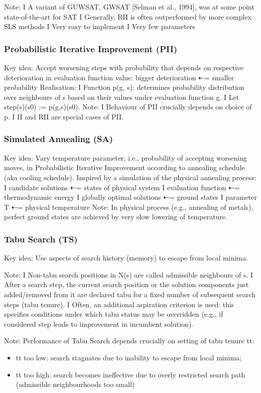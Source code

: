 \documentclass[a4paper,10pt]{article}
\begin{document}
Note:
I A variant of GUWSAT, GWSAT [Selman et al., 1994], was at some point state-of-the-art for SAT
I Generally, RII is often outperformed by more complex SLS methods
I Very easy to implement I Very few parameters

\subsubsection{Probabilistic Iterative Improvement (PII)}
Key idea: Accept worsening steps with probability that depends on respective deterioration in evaluation function value:
bigger deterioration ⇠= smaller probability
Realisation:
I Function p(g, s): determines probability distribution over neighbours of s based on their values under evaluation function g.
I Let step(s)(s0) := p(g,s)(s0). Note:
I Behaviour of PII crucially depends on choice of p. I II and RII are special cases of PII.

\subsubsection{Simulated Annealing (SA)}
Key idea: Vary temperature parameter, i.e., probability of accepting worsening moves, in Probabilistic Iterative Improvement according to annealing schedule (aka cooling schedule).
Inspired by a simulation of the physical annealing process:
I candidate solutions ⇠= states of physical system I evaluation function ⇠= thermodynamic energy
I globally optimal solutions ⇠= ground states
I parameter T ⇠= physical temperature
Note: In physical process (e.g., annealing of metals), perfect ground states are achieved by very slow lowering of temperature.


\subsubsection{Tabu Search (TS)}
Key idea: Use aspects of search history (memory) to escape from local minima.

Note:
I Non-tabu search positions in N(s) are called admissible neighbours of s.
I After a search step, the current search position
or the solution components just added/removed from it are declared tabu for a fixed number of subsequent search steps (tabu tenure).
I Often, an additional aspiration criterion is used: this specifies conditions under which tabu status may be overridden (e.g., if considered step leads to improvement in incumbent solution).

Note: Performance of Tabu Search depends crucially on setting of tabu tenure tt:
\begin{itemize}
	\item tt too low: search stagnates due to inability to escape from local minima;	
	\item tt too high: search becomes ineffective due to overly restricted search path (admissible neighbourhoods too small)
\end{itemize}
\end{document}
